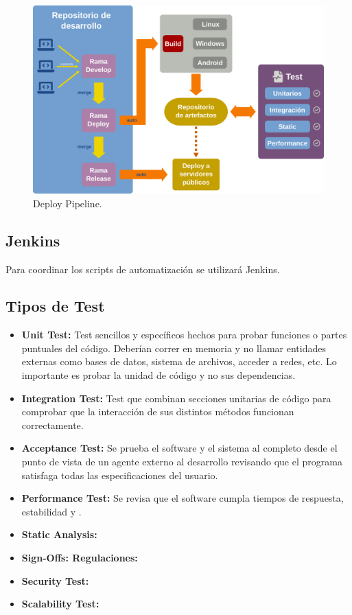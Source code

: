 \begin{figure}[ht]
	\centering
	\includegraphics[width=\textwidth]{images/pipeline.png}
	\caption{Deploy Pipeline.}
\end{figure}

\subsection{Jenkins}

Para coordinar los scripts de automatización se utilizará Jenkins.


\subsection{Tipos de Test}\label{pipeline:tipos-de-test}

\begin{itemize}
  \item \textbf{Unit Test:} Test sencillos y específicos hechos para probar funciones o partes puntuales del código. Deberían correr en memoria y no llamar entidades externas como bases de datos, sistema de archivos, acceder a redes, etc. Lo importante es probar la unidad de código y no sus dependencias.
  \item \textbf{Integration Test:} Test que combinan secciones unitarias de código para comprobar que la interacción de sus distintos métodos funcionan correctamente.
  \item \textbf{Acceptance Test:} Se prueba el software y el sistema al completo desde el punto de vista de un agente externo al desarrollo revisando que el programa satisfaga todas las especificaciones del usuario.
  \item \textbf{Performance Test:} Se revisa que el software cumpla tiempos de respuesta, estabilidad y .
  \item \textbf{Static Analysis:} 
  \item \textbf{Sign-Offs: Regulaciones:} 
  \item \textbf{Security Test:} 
  \item \textbf{Scalability Test:} 
\end{itemize}

